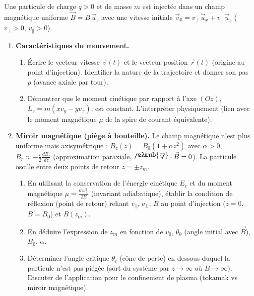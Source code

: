\documentclass[11pt]{article}
\def\nabla{\mathord{\raisebox{\depth}{\scalebox{1}[-1]{$\symup{\Delta}$}}}}%
\begin{document}
\begin{exercice}
Une particule de charge $q>0$ et de masse $m$ est injectée dans un champ magnétique uniforme $\vec{B} = B\,\vec{u}_z$ avec une vitesse initiale $\vec{v}_0 = v_\perp\,\vec{u}_x + v_\parallel\,\vec{u}_z$ ($v_\perp > 0$, $v_\parallel > 0$).

\begin{enumerate}
    \item \textbf{Caractéristiques du mouvement.} 
    \begin{enumerate}
        \item Écrire le vecteur vitesse $\vec{v}(t)$ et le vecteur position $\vec{r}(t)$ (origine au point d'injection). Identifier la nature de la trajectoire et donner son pas $p$ (avance axiale par tour).
        \item Démontrer que le moment cinétique par rapport à l'axe $(Oz)$, $L_z = m(x v_y - y v_x)$, est constant. L'interpréter physiquement (lien avec le moment magnétique $\mu$ de la spire de courant équivalente).
    \end{enumerate}
    \item \textbf{Miroir magnétique (piège à bouteille).} 
    Le champ magnétique n'est plus uniforme mais axisymétrique : $B_z(z) = B_0(1 + \alpha z^2)$ avec $\alpha > 0$, $B_r \approx -\frac{r}{2}\frac{dB_z}{dz}$ (approximation paraxiale, $\nabla \cdot \vec{B}=0$). La particule oscille entre deux points de retour $z = \pm z_m$.
    \begin{enumerate}
        \item En utilisant la conservation de l'énergie cinétique $E_c$ et du moment magnétique $\mu = \frac{m v_\perp^2}{2B}$ (invariant adiabatique), établir la condition de réflexion (point de retour) reliant $v_\parallel$, $v_\perp$, $B$ au point d'injection ($z=0$, $B=B_0$) et $B(z_m)$.
        \item En déduire l'expression de $z_m$ en fonction de $v_0$, $\theta_0$ (angle initial avec $\vec{B}$), $B_0$, $\alpha$.
        \item Déterminer l'angle critique $\theta_c$ (cône de perte) en dessous duquel la particule n'est pas piégée (sort du système par $z \to \infty$ où $B \to \infty$). Discuter de l'application pour le confinement de plasma (tokamak vs miroir magnétique).
    \end{enumerate}
\end{enumerate}
\end{exercice}
\end{document}
